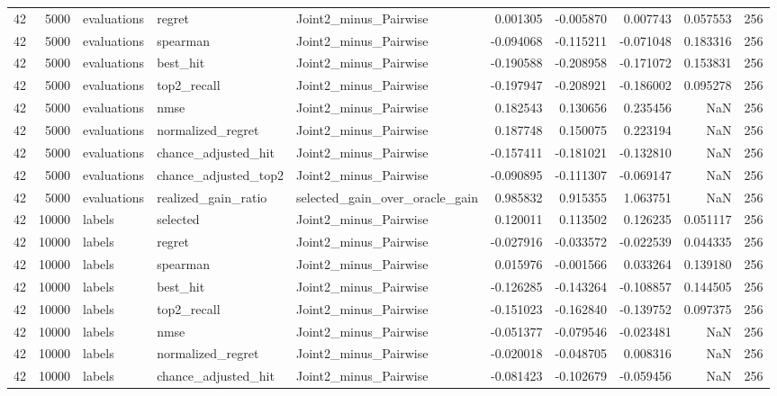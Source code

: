 \begin{tabular}{rrlllrrrrr}
42 & 5000 & evaluations & regret & Joint2_minus_Pairwise & 0.001305 & -0.005870 & 0.007743 & 0.057553 & 256 \\
42 & 5000 & evaluations & spearman & Joint2_minus_Pairwise & -0.094068 & -0.115211 & -0.071048 & 0.183316 & 256 \\
42 & 5000 & evaluations & best_hit & Joint2_minus_Pairwise & -0.190588 & -0.208958 & -0.171072 & 0.153831 & 256 \\
42 & 5000 & evaluations & top2_recall & Joint2_minus_Pairwise & -0.197947 & -0.208921 & -0.186002 & 0.095278 & 256 \\
42 & 5000 & evaluations & nmse & Joint2_minus_Pairwise & 0.182543 & 0.130656 & 0.235456 & NaN & 256 \\
42 & 5000 & evaluations & normalized_regret & Joint2_minus_Pairwise & 0.187748 & 0.150075 & 0.223194 & NaN & 256 \\
42 & 5000 & evaluations & chance_adjusted_hit & Joint2_minus_Pairwise & -0.157411 & -0.181021 & -0.132810 & NaN & 256 \\
42 & 5000 & evaluations & chance_adjusted_top2 & Joint2_minus_Pairwise & -0.090895 & -0.111307 & -0.069147 & NaN & 256 \\
42 & 5000 & evaluations & realized_gain_ratio & selected_gain_over_oracle_gain & 0.985832 & 0.915355 & 1.063751 & NaN & 256 \\
42 & 10000 & labels & selected & Joint2_minus_Pairwise & 0.120011 & 0.113502 & 0.126235 & 0.051117 & 256 \\
42 & 10000 & labels & regret & Joint2_minus_Pairwise & -0.027916 & -0.033572 & -0.022539 & 0.044335 & 256 \\
42 & 10000 & labels & spearman & Joint2_minus_Pairwise & 0.015976 & -0.001566 & 0.033264 & 0.139180 & 256 \\
42 & 10000 & labels & best_hit & Joint2_minus_Pairwise & -0.126285 & -0.143264 & -0.108857 & 0.144505 & 256 \\
42 & 10000 & labels & top2_recall & Joint2_minus_Pairwise & -0.151023 & -0.162840 & -0.139752 & 0.097375 & 256 \\
42 & 10000 & labels & nmse & Joint2_minus_Pairwise & -0.051377 & -0.079546 & -0.023481 & NaN & 256 \\
42 & 10000 & labels & normalized_regret & Joint2_minus_Pairwise & -0.020018 & -0.048705 & 0.008316 & NaN & 256 \\
42 & 10000 & labels & chance_adjusted_hit & Joint2_minus_Pairwise & -0.081423 & -0.102679 & -0.059456 & NaN & 256 \\

\end{tabular}
